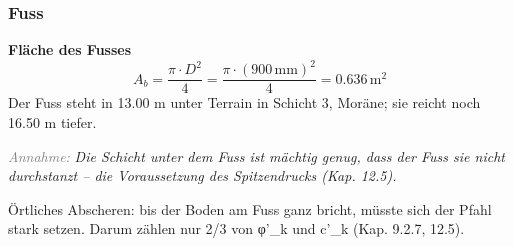 \documentclass[11pt,a4paper]{article}
\newcommand{\hinweis}[2]{\par\noindent\textcolor{gray}{\textit{#1:}} \textit{#2}\par}
\begin{document}
\subsubsection{Fuss}
\noindent\textbf{Fläche des Fusses}
\begin{equation*}
A_b = \frac{\pi \cdot D^{2}}{4} = \frac{\pi \cdot \left(900\,\mathrm{mm}\right)^{2}}{4} = 0.636\,\mathrm{m}^{2}
\end{equation*}
Der Fuss steht in 13.00 m unter Terrain in Schicht 3, Moräne; sie reicht noch 16.50 m tiefer.

\hinweis{Annahme}{Die Schicht unter dem Fuss ist mächtig genug, dass der Fuss sie nicht durchstanzt -- die Voraussetzung des Spitzendrucks (Kap. 12.5).}
Örtliches Abscheren: bis der Boden am Fuss ganz bricht, müsste sich der Pfahl stark setzen. Darum zählen nur 2/3 von φ'\_k und c'\_k (Kap. 9.2.7, 12.5).
\end{document}
